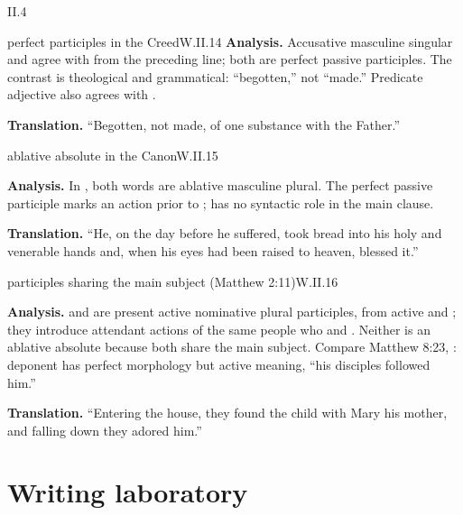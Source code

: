 \begin{courseunit}{II.4}
\begin{workedexample}{perfect participles in the Creed}{W.II.14}
\textbf{Analysis.}  Accusative masculine singular  and  agree
with  from the preceding line; both are perfect passive participles.  The
contrast is theological and grammatical: ``begotten,'' not ``made.''  Predicate adjective
 also agrees with .

\textbf{Translation.}  ``Begotten, not made, of one substance with the Father.''
\end{workedexample}

\begin{workedexample}{ablative absolute in the Canon}{W.II.15}

\textbf{Analysis.}  In , both words are ablative masculine plural.
The perfect passive participle marks an action prior to ;  has
no syntactic role in the main clause.

\textbf{Translation.}  ``He, on the day before he suffered, took bread into his holy and
venerable hands and, when his eyes had been raised to heaven, blessed it.''
\end{workedexample}

\begin{workedexample}{participles sharing the main subject (Matthew 2:11)}{W.II.16}

\textbf{Analysis.}   and  are present active nominative
plural participles, from active  and ; they introduce attendant
actions of the same people who  and .  Neither is an
ablative absolute because both share the main subject.  Compare Matthew 8:23,
: deponent  has perfect morphology
but active meaning, ``his disciples followed him.''

\textbf{Translation.}  ``Entering the house, they found the child with Mary his mother, and
falling down they adored him.''
\end{workedexample}

\section{Writing laboratory}


\end{courseunit}
